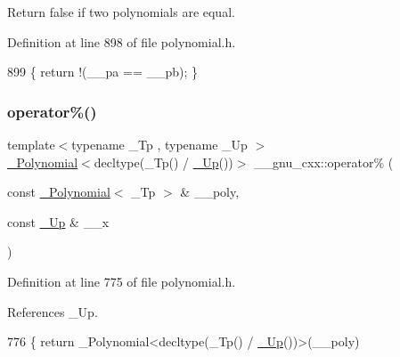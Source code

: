 Return false if two polynomials are equal. 

Definition at line 898 of file polynomial.\+h.


\begin{DoxyCode}
899     \{ \textcolor{keywordflow}{return} !(\_\_pa == \_\_pb); \}
\end{DoxyCode}
\mbox{\label{namespace____gnu__cxx_a3132828069a740986e97f1db8e07325c}} 
\subsubsection{\texorpdfstring{operator\%()}{operator\%()}\hspace{0.1cm}{\footnotesize\ttfamily [1/3]}}
{\footnotesize\ttfamily template$<$typename \+\_\+\+Tp , typename \+\_\+\+Up $>$ \\
\hyperlink{class____gnu__cxx_1_1__Polynomial}{\+\_\+\+Polynomial}$<$decltype(\+\_\+\+Tp() / \hyperlink{namespace____gnu__cxx_ab693ea357b6429b331e0bf09f9442385}{\+\_\+\+Up}())$>$ \+\_\+\+\_\+gnu\+\_\+cxx\+::operator\% (\begin{DoxyParamCaption}\item[{const \hyperlink{class____gnu__cxx_1_1__Polynomial}{\+\_\+\+Polynomial}$<$ \+\_\+\+Tp $>$ \&}]{\+\_\+\+\_\+poly,  }\item[{const \hyperlink{namespace____gnu__cxx_ab693ea357b6429b331e0bf09f9442385}{\+\_\+\+Up} \&}]{\+\_\+\+\_\+x }\end{DoxyParamCaption})\hspace{0.3cm}{\ttfamily [inline]}}



Definition at line 775 of file polynomial.\+h.



References \+\_\+\+Up.


\begin{DoxyCode}
776     \{ \textcolor{keywordflow}{return} \_Polynomial<decltype(\_Tp() / \hyperlink{namespace____gnu__cxx_ab693ea357b6429b331e0bf09f9442385}{\_Up}())>(\_\_poly) %
\end{DoxyCode}
\mbox{\label{namespace____gnu__cxx_a13dae497264694313717a5aa70407de5}} 
